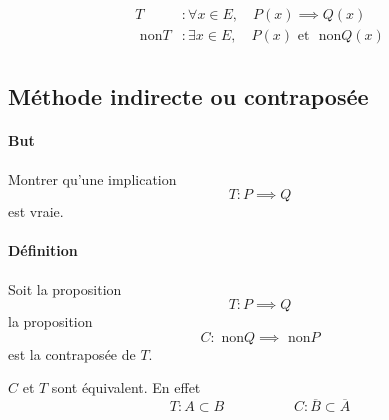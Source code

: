 \documentclass[
    11pt,
    a4paper,
    oneside,
    headinlcude, footinclude,
    twoside,
]{report}
\renewcommand{\bar}[1]{\overline{#1}}
\begin{document}
\begin{center}
    \begin{minipage}{.5\textwidth}
    \end{minipage}
    \begin{minipage}{.49\linewidth}
        \[
            \begin{split}
                T&: \forall x \in E, \quad P(x) \implies Q(x)\\
                \text{ non}T &: \exists x \in E, \quad P(x) \text{ et }  \text{ non}Q(x)\\
            \end{split}
        \]
    \end{minipage}
\end{center}

\subsection{Méthode indirecte ou contraposée}
\label{sub:methode_indirecte_ou_contraposee}

\paragraph{But}

Montrer qu'une implication $$T: P \implies Q$$ est vraie.

\paragraph{Définition}

Soit la proposition $$T: P \implies Q$$ la proposition $$C: \text{ non}Q
\implies \text{ non}P$$ est la contraposée de $T$.

\pagebreak

$C$ et $T$ sont équivalent. En effet $$T: A \subset B \quad \quad \quad \quad
\quad C: \bar B \subset \bar A$$
\end{document}
